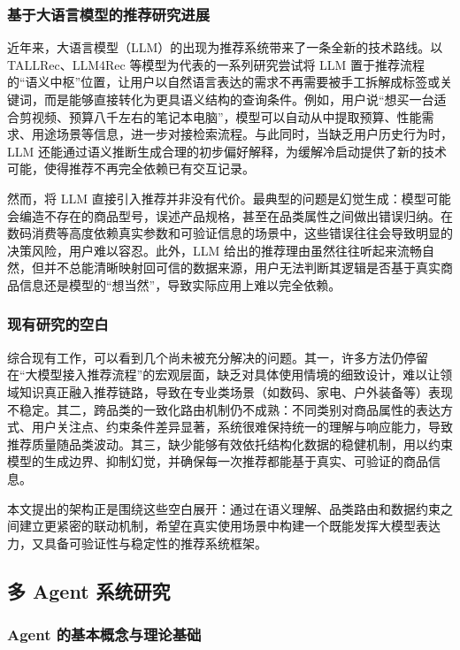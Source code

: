 \documentclass{nkuthesis}
\begin{document}
\subsubsection{基于大语言模型的推荐研究进展}

近年来，大语言模型（LLM）的出现为推荐系统带来了一条全新的技术路线。以 TALLRec、LLM4Rec 等模型为代表的一系列研究尝试将 LLM 置于推荐流程的“语义中枢”位置，让用户以自然语言表达的需求不再需要被手工拆解成标签或关键词，而是能够直接转化为更具语义结构的查询条件。例如，用户说“想买一台适合剪视频、预算八千左右的笔记本电脑”，模型可以自动从中提取预算、性能需求、用途场景等信息，进一步对接检索流程。与此同时，当缺乏用户历史行为时，LLM 还能通过语义推断生成合理的初步偏好解释，为缓解冷启动提供了新的技术可能，使得推荐不再完全依赖已有交互记录。

然而，将 LLM 直接引入推荐并非没有代价。最典型的问题是幻觉生成：模型可能会编造不存在的商品型号，误述产品规格，甚至在品类属性之间做出错误归纳。在数码消费等高度依赖真实参数和可验证信息的场景中，这些错误往往会导致明显的决策风险，用户难以容忍。此外，LLM 给出的推荐理由虽然往往听起来流畅自然，但并不总能清晰映射回可信的数据来源，用户无法判断其逻辑是否基于真实商品信息还是模型的“想当然”，导致实际应用上难以完全依赖。

\subsubsection{现有研究的空白}

综合现有工作，可以看到几个尚未被充分解决的问题。其一，许多方法仍停留在“大模型接入推荐流程”的宏观层面，缺乏对具体使用情境的细致设计，难以让领域知识真正融入推荐链路，导致在专业类场景（如数码、家电、户外装备等）表现不稳定。其二，跨品类的一致化路由机制仍不成熟：不同类别对商品属性的表达方式、用户关注点、约束条件差异显著，系统很难保持统一的理解与响应能力，导致推荐质量随品类波动。其三，缺少能够有效依托结构化数据的稳健机制，用以约束模型的生成边界、抑制幻觉，并确保每一次推荐都能基于真实、可验证的商品信息。

本文提出的架构正是围绕这些空白展开：通过在语义理解、品类路由和数据约束之间建立更紧密的联动机制，希望在真实使用场景中构建一个既能发挥大模型表达力，又具备可验证性与稳定性的推荐系统框架。

\subsection{多 Agent 系统研究}

\subsubsection{Agent 的基本概念与理论基础}
\end{document}
